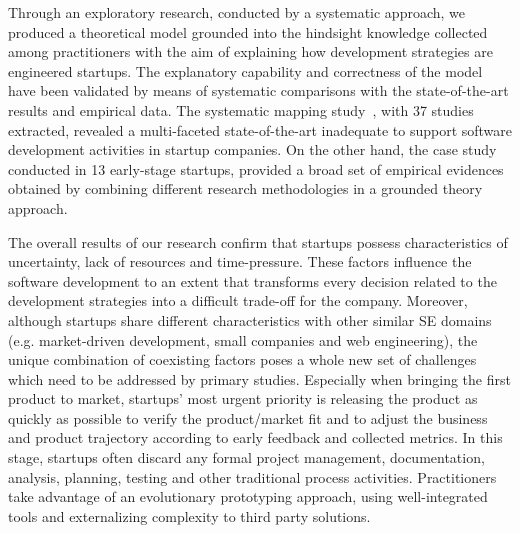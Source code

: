 \documentclass[10pt,journal,letterpaper,compsoc]{IEEEtran}
\begin{document}
Through an exploratory research, conducted by a systematic approach, we
produced a theoretical model grounded into the hindsight knowledge collected
among practitioners with the aim of explaining how development strategies are
engineered startups. The explanatory capability and correctness of the model
have been validated by means of systematic comparisons with the state-of-the-art
results and empirical data. The systematic mapping study~\cite{SMS}, with 37
studies extracted, revealed a multi-faceted state-of-the-art inadequate to
support software development activities in startup companies. 
On the other hand, the case study conducted in 13 early-stage startups, 
provided a broad set of empirical evidences obtained by combining different 
research methodologies in a grounded theory approach.

The overall results of our research confirm that startups possess 
characteristics of uncertainty, lack of resources and time-pressure. These 
factors influence the software development to an extent that
transforms every decision related to the development strategies into a
difficult trade-off for the company. Moreover, although startups share
different characteristics with other similar SE domains (e.g. market-driven
development, small companies and web engineering), the unique combination of
coexisting factors poses a whole new set of challenges which need to be
addressed by primary studies. Especially when bringing the first product to
market, startups' most urgent priority is releasing the product as quickly as
possible to verify the product/market fit and to adjust the business and
product trajectory according to early feedback and collected metrics. In this
stage, startups often discard any formal project management, documentation,
analysis, planning, testing and other traditional process activities.
Practitioners take advantage of an evolutionary prototyping approach, using
well-integrated tools and externalizing complexity to third party solutions.
\end{document}
